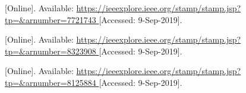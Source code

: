 \begin{thebibliography}{9}

[Online]. Available:
\url{
https://ieeexplore.ieee.org/stamp/stamp.jsp?tp=&arnumber=7721743
}
[Accessed: 9-Sep-2019].


[Online]. Available:
\url{
https://ieeexplore.ieee.org/stamp/stamp.jsp?tp=&arnumber=8323908
}
[Accessed: 9-Sep-2019].



[Online]. Available:
\url{
https://ieeexplore.ieee.org/stamp/stamp.jsp?tp=&arnumber=8125884
}
[Accessed: 9-Sep-2019].





































\end{thebibliography}